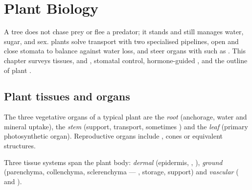 \chapter{Plant Biology}\label{ch:g12:plant-biology}

A tree does not chase prey or flee a predator; it stands and still
manages water, sugar,  and sex.  plants solve transport
with two specialised pipelines, open and close stomata to balance
 against water loss, and steer organs with  such
as . This chapter surveys tissues,  and , stomatal
control, hormone-guided , and the outline of plant .

\section{Plant tissues and organs}

\begin{definition}\label{def:g12:plant-biology:organs}
The three vegetative organs of a typical  plant are the
\emph{root} (anchorage, water and mineral uptake), the
\emph{stem} (support, transport, sometimes )
and the \emph{leaf} (primary photosynthetic organ).
Reproductive organs include , cones or equivalent structures.
\end{definition}

\begin{definition}\label{def:g12:plant-biology:tissues}
Three tissue systems span the plant body:
\emph{dermal} (epidermis, , ),
\emph{ground} (parenchyma, collenchyma, sclerenchyma
--- , storage, support) and \emph{vascular} ( and ).
\end{definition}

